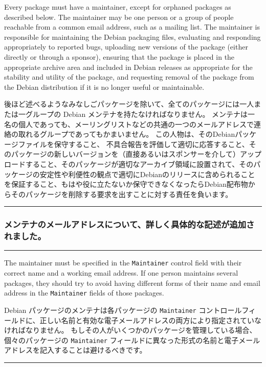 \documentclass[mingoth,a4paper]{jsarticle}
\begin{document}
\par
\parbox[t]{0.46\linewidth}{
	  Every package must have a maintainer, except for orphaned
	  packages as described below.  The maintainer may be one person
	  or a group of people reachable from a common email address, such
	  as a mailing list.  The maintainer is responsible for
	  maintaining the Debian packaging files, evaluating and
	  responding appropriately to reported bugs, uploading new
	  versions of the package (either directly or through a sponsor),
	  ensuring that the package is placed in the appropriate archive
	  area and included in Debian releases as appropriate for the
	  stability and utility of the package, and requesting removal of
	  the package from the Debian distribution if it is no longer
	  useful or maintainable.
}\hfil 
\parbox[t]{0.46\linewidth}{
	    後ほど述べるようなみなしごパッケージを除いて、全てのパッケージには一人または一グループの Debian メンテナを持たなければなりません。
メンテナは一名の個人であっても、メーリングリストなどの共通の一つのメールアドレスで連絡の取れるグループであってもかまいません。
	    この人物は、そのDebianパッケージファイルを保守すること、
	    不具合報告を評価して適切に応答すること、そのパッケージの新しいバージョンを（直接あるいはスポンサーを介して）アップロードすること、そのパッケージが適切なアーカイブ領域に設置されて、そのパッケージの安定性や利便性の観点で適切にDebianのリリースに含められることを保証すること、もはや役に立たないか保守できなくなったらDebian配布物からそのパッケージを削除する要求を出すことに対する責任を負います。
}
\hrule

\clearpage

\subsubsection{メンテナのメールアドレスについて、詳しく具体的な記述が追加されました。}

\vspace{1ex}
\hrule
{}\par
\parbox[t]{0.48\linewidth}{
 	    The maintainer must be specified in the
	    {\tt Maintainer} control field with their correct name
	    and a working email address.  If one person maintains
	    several packages, they should try to avoid having
	    different forms of their name and email address in
	    the {\tt Maintainer} fields of those packages.
}\hfil 
\parbox[t]{0.48\linewidth}{
	    Debian パッケージのメンテナは各パッケージの {\tt Maintainer}
	    コントロールフィールドに、正しい名前と有効な電子メールアドレスの両方により指定されていなければなりません。
	    もしその人がいくつかのパッケージを管理している場合、個々のパッケージの
	    {\tt Maintainer} フィールドに異なった形式の名前と電子メールアドレスを記入することは避けるべきです。
}
\hrule
\end{document}
